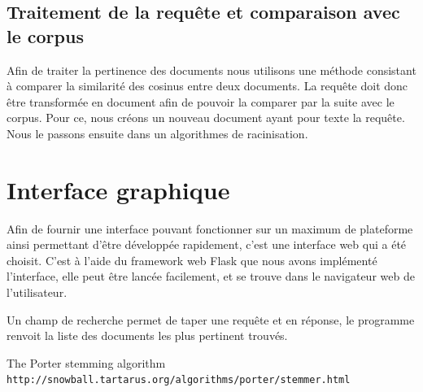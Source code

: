 \documentclass[11pt]{article}
\begin{document}
\subsection{Traitement de la requête et comparaison avec le corpus}
Afin de traiter la pertinence des documents nous utilisons une méthode consistant à comparer la similarité des cosinus entre deux documents. 
La requête doit donc être transformée en document afin de pouvoir la comparer par la suite avec le corpus. 
Pour ce, nous créons un nouveau document ayant pour texte la requête. Nous le passons ensuite dans un algorithmes de racinisation. 

\pagebreak
\section{Interface graphique}
Afin de fournir une interface pouvant fonctionner sur un maximum de plateforme ainsi permettant d'être développée rapidement, c'est une interface web qui a été choisit.
C'est à l'aide du framework web Flask que nous avons implémenté l'interface, elle peut être lancée facilement, et se trouve dans le navigateur web de l'utilisateur.

Un champ de recherche permet de taper une requête et en réponse, le programme renvoit la liste des documents les plus pertinent trouvés. 

\pagebreak

\begin{thebibliography}{9}

    The Porter stemming algorithm
    \\\texttt{http://snowball.tartarus.org/algorithms/porter/stemmer.html}

\end{thebibliography}
\end{document}
